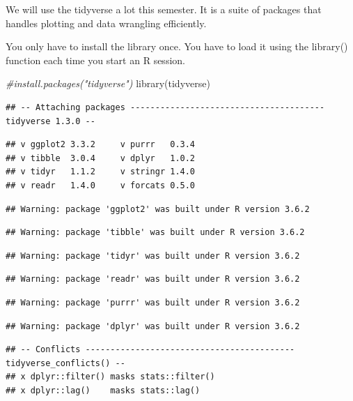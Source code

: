 \documentclass[
]{book}
\newenvironment{Shaded}{\begin{snugshade}}{\end{snugshade}}
\newcommand{\CommentTok}[1]{\textcolor[rgb]{0.56,0.35,0.01}{\textit{#1}}}
\newcommand{\FunctionTok}[1]{\textcolor[rgb]{0.00,0.00,0.00}{#1}}
\newcommand{\NormalTok}[1]{#1}
\begin{document}
We will use the tidyverse a lot this semester. It is a suite of packages that handles plotting and data wrangling efficiently.

You only have to install the library once. You have to load it using the library() function each time you start an R session.

\begin{Shaded}
\begin{Highlighting}[]
\CommentTok{\#install.packages("tidyverse")}
\FunctionTok{library}\NormalTok{(tidyverse)}
\end{Highlighting}
\end{Shaded}

\begin{verbatim}
## -- Attaching packages --------------------------------------- tidyverse 1.3.0 --
\end{verbatim}

\begin{verbatim}
## v ggplot2 3.3.2     v purrr   0.3.4
## v tibble  3.0.4     v dplyr   1.0.2
## v tidyr   1.1.2     v stringr 1.4.0
## v readr   1.4.0     v forcats 0.5.0
\end{verbatim}

\begin{verbatim}
## Warning: package 'ggplot2' was built under R version 3.6.2
\end{verbatim}

\begin{verbatim}
## Warning: package 'tibble' was built under R version 3.6.2
\end{verbatim}

\begin{verbatim}
## Warning: package 'tidyr' was built under R version 3.6.2
\end{verbatim}

\begin{verbatim}
## Warning: package 'readr' was built under R version 3.6.2
\end{verbatim}

\begin{verbatim}
## Warning: package 'purrr' was built under R version 3.6.2
\end{verbatim}

\begin{verbatim}
## Warning: package 'dplyr' was built under R version 3.6.2
\end{verbatim}

\begin{verbatim}
## -- Conflicts ------------------------------------------ tidyverse_conflicts() --
## x dplyr::filter() masks stats::filter()
## x dplyr::lag()    masks stats::lag()
\end{verbatim}
\end{document}
